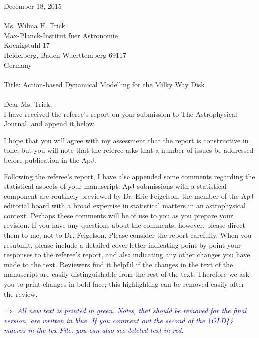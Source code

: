 \documentclass[10pt,a4paper]{article}
\newcommand{\Comment}[1]{\textsl{\textcolor{Blue}{$\Longrightarrow$ {#1}}}}
\begin{document}
December 18, 2015\\\\
Ms. Wilma H. Trick\\
Max-Planck-Institut fuer Astronomie\\
Koenigstuhl 17\\
Heidelberg, Baden-Wuerttemberg 69117\\
Germany\\\\
Title: Action-based Dynamical Modelling for the Milky Way Disk\\\\
Dear Ms. Trick,\\

I have received the referee's report on your submission to The Astrophysical
Journal, and append it below.

I hope that you will agree with my assessment that the report is constructive in
tone, but you will note that the referee asks that a number of issues be addressed
before publication in the ApJ.
  
Following the referee's report, I have also appended some comments regarding the
statistical aspects of your manuscript. ApJ submissions with a statistical component
are routinely previewed by Dr. Eric Feigelson, the member of the ApJ editorial board
with a broad expertise in statistical matters in an astrophysical context. Perhaps
these comments will be of use to you as you prepare your revision. If you have any
questions about the comments, however, please direct them to me, not to Dr.
Feigelson.
Please consider the report carefully. When you resubmit, please include a detailed cover letter indicating point-by-point your responses to the referee's report, and also indicating any other changes you have made to the text. Reviewers find it helpful if the changes in the text of the manuscript are easily distinguishable from the rest of the text. Therefore we ask you to print changes in bold face; this highlighting can be removed easily after the review. 

\Comment{All new text is printed in green. Notes, that should be removed for the final version, are written in blue. If you comment out the second of the \textbackslash OLD\{\} macros in the tex-File, you can also see deleted text in red.}
\end{document}
